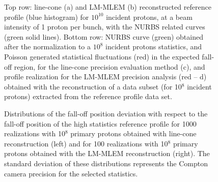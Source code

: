 \begin{figure}
\caption{Top row: line-cone (a) and LM-MLEM (b) reconstructed reference profile (blue histogram) for $10^{10}$ incident protons, at a beam intensity of 1 proton per bunch, with the NURBS related curves (green solid lines). Bottom row: NURBS curve (green) obtained after the normalization to a $10^8$ incident protons statistics, and Poisson generated statistical fluctuations (red) in the expected fall-off region, for the line-cone precision evaluation method (c), and profile realization for the LM-MLEM precision analysis (red -- d) obtained with the reconstruction of a data subset (for 10$^{8}$ incident protons) extracted from the reference profile data set.}
\end{figure}

\begin{figure}
  \centering
  \caption{Distributions of the fall-off position deviation with respect to the fall-off position of the high statistics reference profile for 1000 realizations with 10$^8$ primary protons obtained with line-cone reconstruction (left) and for 100 realizations with 10$^8$ primary protons obtained with the LM-MLEM reconstruction (right). The standard deviation of these distributions represents the Compton camera precision for the selected statistics.}
\end{figure}

